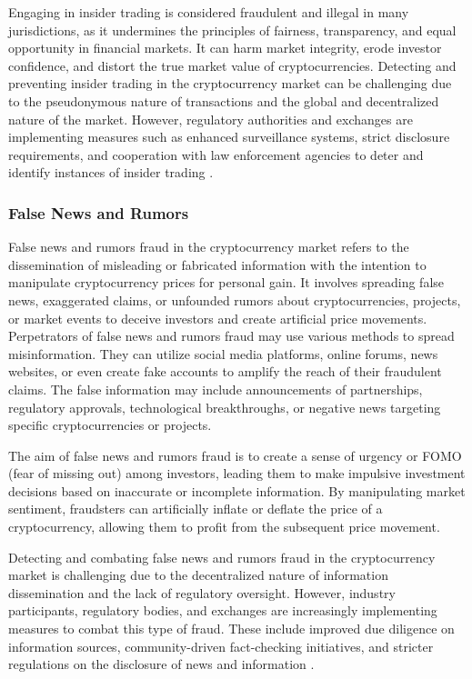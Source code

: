 Engaging in insider trading is considered fraudulent and illegal in many jurisdictions, as it undermines the principles of fairness, transparency, and
equal opportunity in financial markets. It can harm market integrity, erode investor confidence, and distort the true market value of cryptocurrencies.
Detecting and preventing insider trading in the cryptocurrency market can be challenging due to the pseudonymous nature of transactions and the global
and decentralized nature of the market. However, regulatory authorities and exchanges are implementing measures such as enhanced surveillance systems,
strict disclosure requirements, and cooperation with law enforcement agencies to deter and identify instances of insider trading
\cite{chai2019insider, liu2020detecting}.

\subsubsection{False News and Rumors}
False news and rumors fraud in the cryptocurrency market refers to the dissemination of misleading or fabricated information with the intention to
manipulate cryptocurrency prices for personal gain. It involves spreading false news, exaggerated claims, or unfounded rumors about cryptocurrencies,
projects, or market events to deceive investors and create artificial price movements. Perpetrators of false news and rumors fraud may use various
methods to spread misinformation. They can utilize social media platforms, online forums, news websites, or even create fake accounts to amplify the
reach of their fraudulent claims. The false information may include announcements of partnerships, regulatory approvals, technological breakthroughs,
or negative news targeting specific cryptocurrencies or projects.

The aim of false news and rumors fraud is to create a sense of urgency or FOMO (fear of missing out) among investors, leading them to make impulsive
investment decisions based on inaccurate or incomplete information. By manipulating market sentiment, fraudsters can artificially inflate or deflate
the price of a cryptocurrency, allowing them to profit from the subsequent price movement.

Detecting and combating false news and rumors fraud in the cryptocurrency market is challenging due to the decentralized nature of information
dissemination and the lack of regulatory oversight. However, industry participants, regulatory bodies, and exchanges are increasingly implementing
measures to combat this type of fraud. These include improved due diligence on information sources, community-driven fact-checking initiatives, and
stricter regulations on the disclosure of news and information \cite{yang2021spreading, feng2020cryptocurrency}.